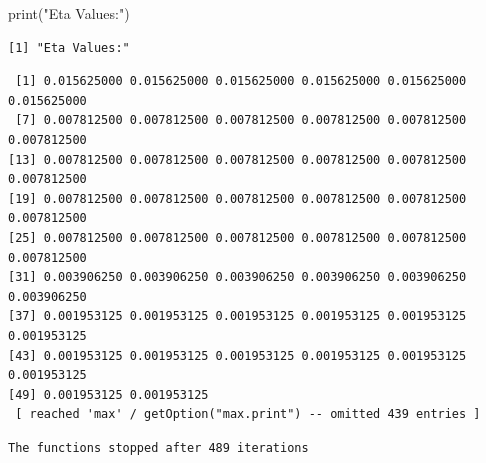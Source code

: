 \documentclass[
  letterpaper,
  DIV=11,
  numbers=noendperiod]{scrartcl}
\newenvironment{Shaded}{\begin{snugshade}}{\end{snugshade}}
\newcommand{\FunctionTok}[1]{\textcolor[rgb]{0.28,0.35,0.67}{#1}}
\newcommand{\NormalTok}[1]{\textcolor[rgb]{0.00,0.23,0.31}{#1}}
\newcommand{\SpecialCharTok}[1]{\textcolor[rgb]{0.37,0.37,0.37}{#1}}
\newcommand{\StringTok}[1]{\textcolor[rgb]{0.13,0.47,0.30}{#1}}
\begin{document}
\begin{Shaded}
\begin{Highlighting}[]
\FunctionTok{print}\NormalTok{(}\StringTok{"Eta Values:"}\NormalTok{)}
\end{Highlighting}
\end{Shaded}

\begin{verbatim}
[1] "Eta Values:"
\end{verbatim}

\begin{Shaded}
\end{Shaded}

\begin{verbatim}
 [1] 0.015625000 0.015625000 0.015625000 0.015625000 0.015625000 0.015625000
 [7] 0.007812500 0.007812500 0.007812500 0.007812500 0.007812500 0.007812500
[13] 0.007812500 0.007812500 0.007812500 0.007812500 0.007812500 0.007812500
[19] 0.007812500 0.007812500 0.007812500 0.007812500 0.007812500 0.007812500
[25] 0.007812500 0.007812500 0.007812500 0.007812500 0.007812500 0.007812500
[31] 0.003906250 0.003906250 0.003906250 0.003906250 0.003906250 0.003906250
[37] 0.001953125 0.001953125 0.001953125 0.001953125 0.001953125 0.001953125
[43] 0.001953125 0.001953125 0.001953125 0.001953125 0.001953125 0.001953125
[49] 0.001953125 0.001953125
 [ reached 'max' / getOption("max.print") -- omitted 439 entries ]
\end{verbatim}

\begin{Shaded}
\end{Shaded}

\begin{verbatim}
The functions stopped after 489 iterations 
 
\end{verbatim}
\end{document}
